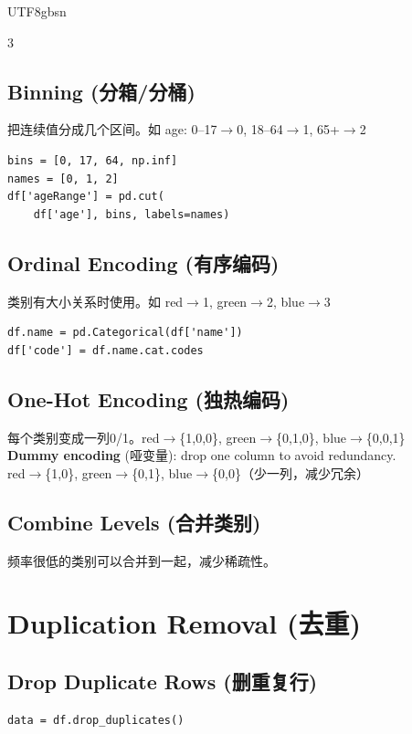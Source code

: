 \documentclass[10pt,landscape,a4paper]{article}
\newcommand{\zhint}[1]{{\scriptsize\color{gray!70!black}#1}}
\begin{document}
\begin{CJK}{UTF8}{gbsn}
\begin{multicols}{3}
\subsection{Binning \zhint{(分箱/分桶)}}
\zhint{把连续值分成几个区间。如 age: 0--17$\to$0, 18--64$\to$1, 65+$\to$2}
\begin{lstlisting}
bins = [0, 17, 64, np.inf]
names = [0, 1, 2]
df['ageRange'] = pd.cut(
    df['age'], bins, labels=names)
\end{lstlisting}

\subsection{Ordinal Encoding \zhint{(有序编码)}}
\zhint{类别有大小关系时使用。如 red$\to$1, green$\to$2, blue$\to$3}
\begin{lstlisting}
df.name = pd.Categorical(df['name'])
df['code'] = df.name.cat.codes
\end{lstlisting}

\subsection{One-Hot Encoding \zhint{(独热编码)}}
\zhint{每个类别变成一列0/1。red$\to$\{1,0,0\}, green$\to$\{0,1,0\}, blue$\to$\{0,0,1\}}\\
\textbf{Dummy encoding} \zhint{(哑变量)}: drop one column to avoid redundancy.\\
\zhint{red$\to$\{1,0\}, green$\to$\{0,1\}, blue$\to$\{0,0\}（少一列，减少冗余）}

\subsection{Combine Levels \zhint{(合并类别)}}
\zhint{频率很低的类别可以合并到一起，减少稀疏性。}

\section{Duplication Removal \zhint{(去重)}}

\subsection{Drop Duplicate Rows \zhint{(删重复行)}}
\begin{lstlisting}
data = df.drop_duplicates()
\end{lstlisting}


\end{multicols}
\end{CJK}
\end{document}
